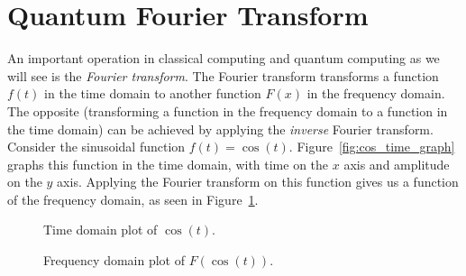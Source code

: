 \documentclass[11pt, notitlepage]{report}
\begin{document}
\section{Quantum Fourier Transform}
An important operation in classical computing and quantum computing as we will see is the \emph{Fourier transform}. The Fourier transform transforms a function $f(t)$ in the time domain to another function $F(x)$ in the frequency domain. The opposite (transforming a function in the frequency domain to a function in the time domain) can be achieved by applying the \emph{inverse} Fourier transform. Consider the sinusoidal function $f(t) = \cos(t)$. Figure~\ref{fig:cos_time_graph} graphs this function in the time domain, with time on the $x$ axis and amplitude on the $y$ axis. Applying the Fourier transform on this function gives us a function of the frequency domain, as seen in Figure~\ref{fig:cos_freq_graph}.
\begin{figure}[ht]
  \centering
  \begin{multicols}{2}
     \caption{Time domain plot of $\cos(t)$.}
     \label{fig:cos_time_graph}
     
     \caption{Frequency domain plot of $F(\cos(t))$.}
     \label{fig:cos_freq_graph}
   \end{multicols}
\end{figure}
\end{document}
